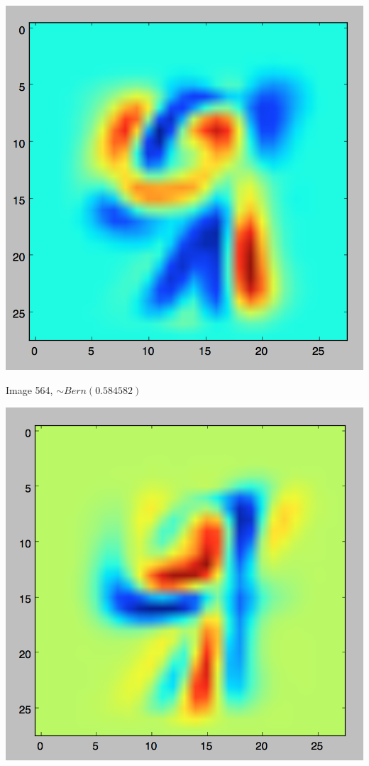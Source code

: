 \documentclass[twoside,11pt]{homework}
\begin{document}
\includegraphics[scale=.5]{images/156.png}

Image 564, $\sim Bern(0.584582)$

\includegraphics[scale=.5]{images/564.png}
\end{document}
